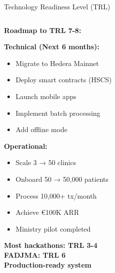\documentclass[aspectratio=169,xcolor=dvipsnames,20pt]{beamer}
\newcommand{\checkitem}{\item[\color{SuccessGreen}\faCheckCircle]}
\begin{document}
\begin{frame}{Technology Readiness Level (TRL)}
\begin{columns}[T]
    \begin{column}{0.5\textwidth}
      \textbf{Roadmap to TRL 7-8:}

      \textbf{Technical (Next 6 months):}
      \begin{itemize}
        \checkitem Migrate to Hedera Mainnet
        \checkitem Deploy smart contracts (HSCS)
        \checkitem Launch mobile apps
        \checkitem Implement batch processing
        \checkitem Add offline mode
      \end{itemize}

      \vspace{0.2cm}

      \textbf{Operational:}
      \begin{itemize}
        \checkitem Scale 3 → 50 clinics
        \checkitem Onboard 50 → 50,000 patients
        \checkitem Process 10,000+ tx/month
        \checkitem Achieve €100K ARR
        \checkitem Ministry pilot completed
      \end{itemize}

      \vspace{0.2cm}

      \begin{center}
        \textbf{Most hackathons: TRL 3-4} \\
        \textbf{FADJMA: TRL 6} \\
        \textcolor{SuccessGreen}{\textbf{Production-ready system}}
      \end{center}
    \end{column}
  \end{columns}

\end{frame}
\end{document}

